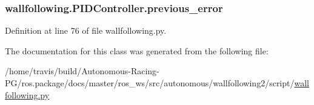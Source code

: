 \subsubsection[{\texorpdfstring{previous\+\_\+error}{previous_error}}]{\setlength{\rightskip}{0pt plus 5cm}wallfollowing.\+P\+I\+D\+Controller.\+previous\+\_\+error}\hypertarget{classwallfollowing_1_1_p_i_d_controller_a8f880f52e6d6f020769ab01d6459c908}{}\label{classwallfollowing_1_1_p_i_d_controller_a8f880f52e6d6f020769ab01d6459c908}


Definition at line 76 of file wallfollowing.\+py.



The documentation for this class was generated from the following file\+:\begin{DoxyCompactItemize}
\item 
/home/travis/build/\+Autonomous-\/\+Racing-\/\+P\+G/ros.\+package/docs/master/ros\+\_\+ws/src/autonomous/wallfollowing2/script/\hyperlink{wallfollowing_8py}{wallfollowing.\+py}\end{DoxyCompactItemize}

